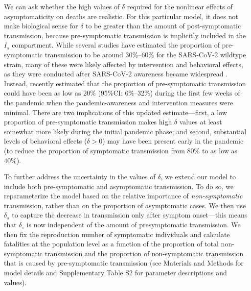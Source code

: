 \documentclass[12pt]{article}
\begin{document}
We can ask whether the high values of $\delta$ required for the nonlinear effects of asymptomaticity on deaths are realistic.
For this particular model, it does not make biological sense for $\delta$ to be greater than the amount of post-symptomatic transmission, because pre-symptomatic transmission is implicitly included in the $I_s$ compartment.
While several studies have estimated the proportion of pre-symptomatic transmission to be around 30\%--60\% for the SARS-CoV-2 wildtype strain, many of these were likely affected by intervention and behavioral effects, as they were conducted after SARS-CoV-2 awareness became widespread \cite{he2020temporal}.
Instead, \cite{sender2021unmitigated} recently estimated that the proportion of pre-symptomatic transmission could have been as low as 20\% (95\%CI: 6\%--32\%) during the first few weeks of the pandemic when the pandemic-awareness and intervention measures were minimal.
There are two implications of this updated estimate---first, a low proportion of pre-symptomatic transmission makes high $\delta$ values at least somewhat more likely during the initial pandemic phase; and second, substantial levels of behavioral effects ($\delta > 0$) may have been present early in the pandemic (to reduce the proportion of symptomatic transmission from 80\% to as low as 40\%).

To further address the uncertainty in the values of $\delta$, we extend our model to include both pre-symptomatic and asymptomatic transmission.
To do so, we reparameterize the model based on the relative importance of \textit{non-symptomatic} transmission, rather than on the proportion of asymptomatic cases.
We then use $\delta_s$ to capture the decrease in transmission only after symptom onset---this means that $\delta_s$ is now independent of the amount of presymptomatic transmission.
We then fix the reproduction number of symptomatic individuals and calculate fatalities at the population level as a function of the proportion of total non-symptomatic transmission and the proportion of non-symptomatic transmission that is caused by pre-symptomatic transmission (see Materials and Methods for model details and Supplementary Table S2 for parameter descriptions and values).
\end{document}
